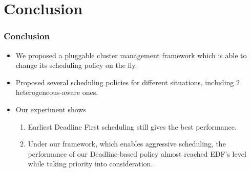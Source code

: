\section{Conclusion}

\begin{frame}
  \frametitle{Conclusion}
  \begin{itemize}
    \item We proposed a pluggable cluster management framework which is
      able to change its scheduling policy on the fly.
    \item Proposed several scheduling policies for different situations,
      including 2 heterogeneous-aware ones.
    \item Our experiment shows 
      \begin{enumerate}
        \item Earliest Deadline First scheduling still gives the best
          performance.
        \item Under our framework, which enables aggressive scheduling,
          the performance of our Deadline-based policy almost reached
          EDF's level while taking priority into consideration.
      \end{enumerate}
  \end{itemize}
\end{frame}


